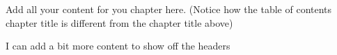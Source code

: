 Add all your content for you chapter here.
(Notice how the table of contents chapter title is different from the chapter title above)

\newpage

I can add a bit more content to show off the headers